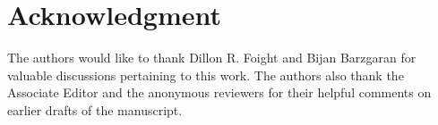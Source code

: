 \documentclass[journal]{IEEEtran}
\theoremstyle{definition}
\theoremstyle{remark}
\begin{document}
\section*{Acknowledgment}
The authors would like to thank Dillon R. Foight and Bijan Barzgaran for valuable discussions pertaining to this work.
The authors also thank the Associate Editor and the anonymous reviewers for their helpful comments on earlier drafts of the manuscript.




\end{document}
